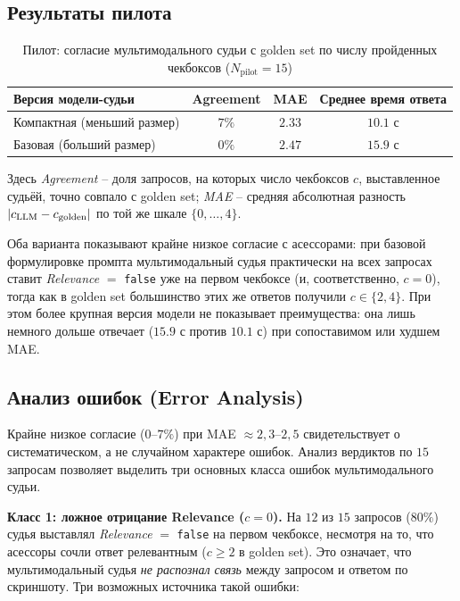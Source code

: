\subsection{Результаты пилота}

\begin{table}[htbp]
    \centering
    \caption{Пилот: согласие мультимодального судьи с golden set по числу
    пройденных чекбоксов ($N_{\mathrm{pilot}} = 15$)}
    \label{tab:pilot-multimodal-results}
    \begin{tabular}{lccc}
        \toprule
        Версия модели-судьи & Agreement & MAE & Среднее время ответа \\
        \midrule
        Компактная (меньший размер) & $7\%$ & $2.33$ & $10.1$ с \\
        Базовая (больший размер) & $0\%$ & $2.47$ & $15.9$ с \\
        \bottomrule
    \end{tabular}
\end{table}

Здесь \emph{Agreement} -- доля запросов, на которых число чекбоксов $c$,
выставленное судьёй, точно совпало с golden set; \emph{MAE} -- средняя
абсолютная разность $\left\lvert c_{\mathrm{LLM}} - c_{\mathrm{golden}}\right\rvert$ по той
же шкале $\{0,\dots,4\}$.

Оба варианта показывают крайне низкое согласие с асессорами: при базовой
формулировке промпта мультимодальный судья практически на всех запросах
ставит \emph{Relevance} $=$ \texttt{false} уже на первом чекбоксе (и,
соответственно, $c = 0$), тогда как в golden set большинство этих же
ответов получили $c \in \{2, 4\}$. При этом более крупная версия модели не
показывает преимущества: она лишь немного дольше отвечает ($15.9$ с против
$10.1$ с) при сопоставимом или худшем MAE.

\subsection{Анализ ошибок (Error Analysis)}
\label{sec:experiments:pilot:error-analysis}

Крайне низкое согласие ($0$--$7\%$) при MAE $\approx 2{,}3$--$2{,}5$
свидетельствует о систематическом, а не случайном характере ошибок.
Анализ вердиктов по $15$ запросам позволяет выделить три основных
класса ошибок мультимодального судьи.

\textbf{Класс 1: ложное отрицание Relevance ($c = 0$).}
На $12$ из $15$ запросов ($80\%$) судья выставлял
\emph{Relevance} $=$ \texttt{false} на первом чекбоксе, несмотря на
то, что асессоры сочли ответ релевантным ($c \ge 2$ в golden set).
Это означает, что мультимодальный судья \emph{не распознал связь}
между запросом и ответом по скриншоту.
Три возможных источника такой ошибки:

